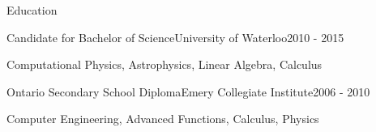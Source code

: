 \documentclass[10pt, oneside]{resume}
\begin{document}
  \begin{rSection}{Education}

    \begin{rEducation}{Candidate for Bachelor of Science}{University of Waterloo}{2010 - 2015}
      \item Computational Physics, Astrophysics, Linear Algebra, Calculus
    \end{rEducation}

    \begin{rEducation}{Ontario Secondary School Diploma}{Emery Collegiate Institute}{2006 - 2010}
      \item Computer Engineering, Advanced Functions, Calculus, Physics
    \end{rEducation}

  \end{rSection}
\end{document}
